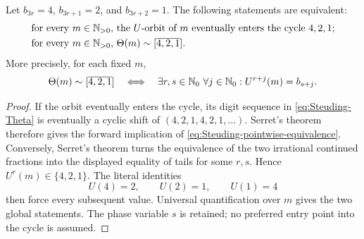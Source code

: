 \begin{theorem}
\label{thm:Steuding-522-equivalence}
Let $b_{3r}=4$, $b_{3r+1}=2$, and $b_{3r+2}=1$.  The following statements
are equivalent:
\begin{align*}
 &\text{for every $m\in\mathbb{N}_{>0}$, the $U$-orbit of $m$ eventually enters the
 cycle $4,2,1$};\\
 &\text{for every $m\in\mathbb{N}_{>0}$, }\Theta(m)\sim[\overline{4,2,1}].
\end{align*}
More precisely, for each fixed $m$,
\begin{equation}
\label{eq:Steuding-pointwise-equivalence}
 \Theta(m)\sim[\overline{4,2,1}]
 \quad\Longleftrightarrow\quad
 \exists r,s\in\mathbb{N}_{0}\ \forall j\in\mathbb{N}_{0}:
 U^{r+j}(m)=b_{s+j}.
\end{equation}
\end{theorem}

\begin{proof}
If the orbit eventually enters the cycle, its digit sequence in
\eqref{eq:Steuding-Theta} is eventually a cyclic shift of
$(4,2,1,4,2,1,\ldots)$.  Serret's theorem therefore gives the forward
implication of \eqref{eq:Steuding-pointwise-equivalence}.  Conversely,
Serret's theorem turns the equivalence of the two irrational continued
fractions into the displayed equality of tails for some $r,s$.  Hence
$U^r(m)\in\{4,2,1\}$.  The literal identities
\[
 U(4)=2,
 \qquad U(2)=1,
 \qquad U(1)=4
\]
then force every subsequent value.  Universal quantification over $m$ gives
the two global statements.  The phase variable $s$ is retained; no preferred
entry point into the cycle is assumed.
\end{proof}

